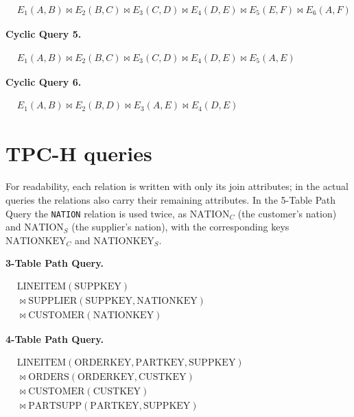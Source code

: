 \noindent$\displaystyle
\begin{aligned}
& E_1(A,B) \bowtie E_2(B,C) \bowtie E_3(C,D) \bowtie E_4(D,E) \bowtie E_5(E,F) \bowtie E_6(A,F)
\end{aligned}$

\medskip
\noindent\textbf{Cyclic Query 5.}

\noindent$\displaystyle
\begin{aligned}
& E_1(A,B) \bowtie E_2(B,C) \bowtie E_3(C,D) \bowtie E_4(D,E) \bowtie E_5(A,E)
\end{aligned}$

\medskip
\noindent\textbf{Cyclic Query 6.}

\noindent$\displaystyle
\begin{aligned}
& E_1(A,B) \bowtie E_2(B,D) \bowtie E_3(A,E) \bowtie E_4(D,E)
\end{aligned}$

\section{TPC-H queries}
\label{app:queries_tpch}

For readability, each relation is written with only its join attributes; in the actual queries the relations also carry their remaining attributes. In the 5-Table Path Query the \texttt{NATION} relation is used twice, as $\mathrm{NATION}_C$ (the customer's nation) and $\mathrm{NATION}_S$ (the supplier's nation), with the corresponding keys $\mathrm{NATIONKEY}_C$ and $\mathrm{NATIONKEY}_S$.

\medskip
\noindent\textbf{3-Table Path Query.}

\noindent$\displaystyle
\begin{aligned}
& \mathrm{LINEITEM}(\mathrm{SUPPKEY}) \\
& {} \bowtie \mathrm{SUPPLIER}(\mathrm{SUPPKEY}, \mathrm{NATIONKEY}) \\
& {} \bowtie \mathrm{CUSTOMER}(\mathrm{NATIONKEY})
\end{aligned}$

\medskip
\noindent\textbf{4-Table Path Query.}

\noindent$\displaystyle
\begin{aligned}
& \mathrm{LINEITEM}(\mathrm{ORDERKEY}, \mathrm{PARTKEY}, \mathrm{SUPPKEY}) \\
& {} \bowtie \mathrm{ORDERS}(\mathrm{ORDERKEY}, \mathrm{CUSTKEY}) \\
& {} \bowtie \mathrm{CUSTOMER}(\mathrm{CUSTKEY}) \\
& {} \bowtie \mathrm{PARTSUPP}(\mathrm{PARTKEY}, \mathrm{SUPPKEY})
\end{aligned}$

